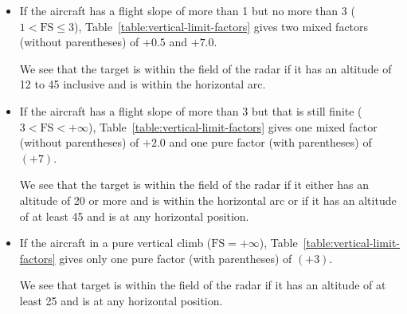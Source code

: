 {\begin{itemize}
We see that the target is within the field of the radar if it has an altitude of 8 to 20 inclusive and is within the  horizontal arc.

\item
If the aircraft has a flight slope of more than 1 but no more than 3 ($1 < \mbox{FS} \le 3$), Table~\ref{table:vertical-limit-factors} gives two mixed factors (without parentheses) of $+0.5$ and $+7.0$. 

We see that the target is within the field of the radar if it has an altitude of 12 to 45 inclusive and is within the  horizontal arc.

\item
If the aircraft has a flight slope of more than 3 but that is still finite ($3 < \mbox{FS} < +\infty$), Table~\ref{table:vertical-limit-factors} gives one mixed factor (without parentheses) of $+2.0$ and one pure factor (with parentheses) of $(+7)$.

We see that the target is within the field of the radar if it either has an altitude of 20 or more and is within the  horizontal arc or if it has an altitude of at least 45 and is at any horizontal position.

\item
If the aircraft in a pure vertical climb ($\mbox{FS} = +\infty$), Table~\ref{table:vertical-limit-factors} gives only one pure factor (with parentheses) of $(+3)$.

We see that target is within the field of the radar if it has an altitude of at least 25 and is at any horizontal position.

\end{itemize}



}

